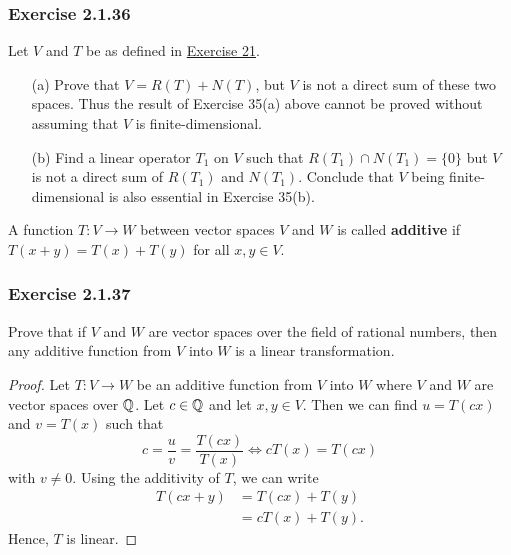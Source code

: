 \subsubsection{Exercise 2.1.36} Let \( V  \) and \( T  \) be as defined in {\hyperref[Exercise 21]{Exercise 21}}.
\begin{enumerate}
    \item[(a)] Prove that \( V = R(T) + N(T)  \), but \( V  \) is not a direct sum of these two spaces. Thus the result of Exercise 35(a) above cannot be proved without assuming that \( V  \) is finite-dimensional.
    \item[(b)] Find a linear operator \( T_{1}  \) on \( V  \) such that \( R(T_{1}) \cap N(T_{1}) = \{ 0  \}  \) but \( V  \) is not a direct sum of \( R(T_{1}) \) and \( N(T_{1})  \). Conclude that \( V  \) being finite-dimensional is also essential in Exercise 35(b).
\end{enumerate}

\begin{definition}[Additive]
    A function \( T: V \to W  \) between vector spaces \( V  \) and \( W  \) is called \textbf{additive} if \( T(x+y) = T(x) + T(y) \) for all \( x,y \in V  \).
\end{definition}

\subsubsection{Exercise 2.1.37} Prove that if \( V  \) and \( W  \) are vector spaces over the field of rational numbers, then any additive function from \( V  \) into \( W  \) is a linear transformation. 
\begin{proof}
Let \( T: V \to W  \) be an additive function from \( V  \) into \( W  \) where \( V  \) and \( W  \) are vector spaces over \( \mathbb{Q} \). Let \( c \in \mathbb{Q}  \) and let \( x,y \in V  \). Then we can find \( u = T(cx)  \) and \( v = T(x) \) such that 
\[  c = \frac{ u }{ v }  = \frac{ T(cx) }{ T(x) } \iff cT(x) = T(cx) \]
with \( v  \neq  0  \). Using the additivity of \( T  \), we can write
\begin{align*}
    T(cx+y) &=  T(cx) + T(y) \\
            &= cT(x) + T(y).
\end{align*}
Hence, \( T  \) is linear.
\end{proof}

